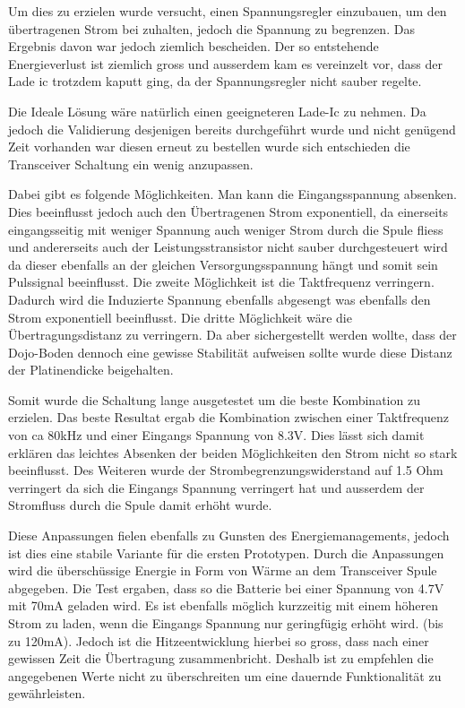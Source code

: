 Um dies zu erzielen wurde versucht, einen Spannungsregler einzubauen, um den übertragenen Strom bei zuhalten, jedoch die Spannung zu begrenzen. Das Ergebnis davon war jedoch ziemlich bescheiden. Der so entstehende Energieverlust ist ziemlich gross und ausserdem kam es vereinzelt vor, dass der Lade ic trotzdem kaputt ging, da der Spannungsregler nicht sauber regelte. 

Die Ideale Lösung wäre natürlich einen geeigneteren Lade-Ic zu nehmen. Da jedoch die Validierung desjenigen bereits durchgeführt wurde und nicht genügend Zeit vorhanden war diesen erneut zu bestellen wurde sich entschieden die Transceiver Schaltung ein wenig anzupassen.

Dabei gibt es folgende Möglichkeiten. Man kann die Eingangsspannung absenken. Dies beeinflusst jedoch auch den Übertragenen Strom exponentiell, da einerseits eingangsseitig mit weniger Spannung auch weniger Strom durch die Spule fliess und andererseits auch der Leistungsstransistor nicht sauber durchgesteuert wird da dieser ebenfalls an der gleichen Versorgungsspannung hängt und somit sein Pulssignal beeinflusst. Die zweite Möglichkeit ist die Taktfrequenz verringern. Dadurch wird die Induzierte Spannung ebenfalls abgesengt was ebenfalls den Strom exponentiell beeinflusst. Die dritte Möglichkeit wäre die Übertragungsdistanz zu verringern. Da aber sichergestellt werden wollte, dass der Dojo-Boden dennoch eine gewisse Stabilität aufweisen sollte wurde diese Distanz der Platinendicke beigehalten.

Somit wurde die Schaltung lange ausgetestet um die beste Kombination zu erzielen. Das beste Resultat ergab die Kombination zwischen einer Taktfrequenz von ca 80kHz und einer Eingangs Spannung von 8.3V. Dies lässt sich damit erklären das leichtes Absenken der beiden Möglichkeiten den Strom nicht so stark beeinflusst. Des Weiteren wurde der Strombegrenzungswiderstand auf 1.5 Ohm verringert da sich die Eingangs Spannung verringert hat und ausserdem der Stromfluss durch die Spule damit erhöht wurde. 

Diese Anpassungen fielen ebenfalls zu Gunsten des Energiemanagements, jedoch ist dies eine stabile Variante für die ersten Prototypen. Durch die Anpassungen wird die überschüssige Energie in Form von Wärme an dem Transceiver Spule abgegeben. Die Test ergaben, dass so die Batterie bei einer Spannung von 4.7V mit 70mA geladen wird. Es ist ebenfalls möglich kurzzeitig mit einem höheren Strom zu laden, wenn die Eingangs Spannung nur geringfügig erhöht wird. (bis zu 120mA). Jedoch ist die Hitzeentwicklung hierbei so gross, dass nach einer gewissen Zeit die Übertragung zusammenbricht. Deshalb ist zu empfehlen die angegebenen Werte nicht zu überschreiten um eine dauernde Funktionalität zu gewährleisten.

